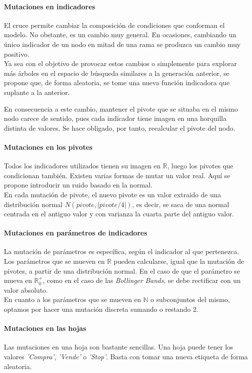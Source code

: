 \paragraph{Mutaciones en indicadores}
El cruce permite cambiar la composici\'on de condiciones que conforman el modelo. No obstante, es un cambio muy general. En ocasiones, cambiando un \'unico indicador de un nodo en mitad de una rama se produzca un cambio muy positivo.\\

Ya sea con el objetivo de provocar estos cambios o simplemente para explorar m\'as \'arboles en el espacio de b\'usqueda similares a la generaci\'on anterior, se propone que, de forma aleatoria, se tome una nueva funci\'on indicadora que suplante a la anterior. 

En consecuencia a este cambio, mantener el pivote que se situaba en el mismo nodo carece de sentido, pues cada indicador tiene imagen en una horquilla distinta de valores. Se hace obligado, por tanto, recalcular el pivote del nodo.  

\paragraph{Mutaciones en los pivotes}

Todos los indicadores utilizados tienen su imagen en $\mathbb{R}$, luego los pivotes que condicionan tambi\'en. Existen varias formas de mutar un valor real. Aqu\'i se propone introducir un ruido basado en la normal.\\

En cada mutaci\'on de pivote, el nuevo pivote es un valor extraido de una distribuci\'on normal $N(pivote, |pivote/4|)$, es decir, se saca de una normal centrada en el antiguo valor y con varianza la cuarta parte del antiguo valor.

\paragraph{Mutaciones en par\'ametros de indicadores}
La mutaci\'on de par\'ametros es espec\'ifica, seg\'un el indicador al que pertenezca.\\

Los par\'ametros que se mueven en $\mathbb{R}$ pueden calcularse, igual que la mutaci\'on de pivotes, a partir de una distribuci\'on normal. En el caso de que el par\'ametro se mueva en $\mathbb{R}_0^+$, como en el caso de las \textit{Bollinger Bands}, se debe rectificar con un valor absoluto.\\

En cuanto a los par\'ametros que se mueven en $\mathbb{N}$ o subconjuntos del mismo, optamos por hacer una mutaci\'on discreta sumando o restando 2. 

\paragraph{Mutaciones en las hojas}
Las mutaciones en una hoja son bastante sencillas. Una hoja puede tener los valores \textit{'Compra'}, \textit{'Vende'} o \textit{'Stop'}. Basta con tomar una nueva etiqueta de forma aleatoria.


